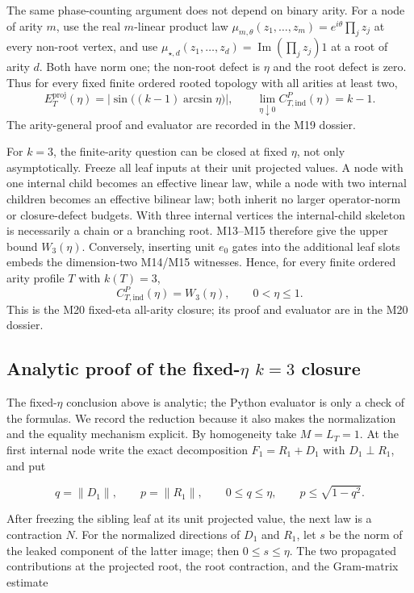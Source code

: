 \documentclass[11pt]{amsart}
\theoremstyle{definition}
\theoremstyle{remark}
\begin{document}
The same phase-counting argument does not depend on binary arity. For a node
of arity $m$, use the real $m$-linear product law
$\mu_{m,\theta}(z_1,\ldots,z_m)=e^{i\theta}\prod_j z_j$ at every non-root
vertex, and use $\mu_{\star,d}(z_1,\ldots,z_d)=
\operatorname{Im}(\prod_j z_j)1$ at a root of arity $d$. Both have norm one;
the non-root defect is $\eta$ and the root defect is zero. Thus for every
fixed finite ordered rooted topology with all arities at least two,
\[
 E_T^{\mathrm{proj}}(\eta)=
 \left|\sin\bigl((k-1)\arcsin\eta\bigr)\right|,
 \qquad
 \lim_{\eta\downarrow0}C_{T,\mathrm{ind}}^P(\eta)=k-1.
\]
The arity-general proof and evaluator are recorded in the M19 dossier.

For $k=3$, the finite-arity question can be closed at fixed $\eta$, not only
asymptotically. Freeze all leaf inputs at their unit projected values. A node
with one internal child becomes an effective linear law, while a node with two
internal children becomes an effective bilinear law; both inherit no larger
operator-norm or closure-defect budgets. With three internal vertices the
internal-child skeleton is necessarily a chain or a branching root. M13--M15
therefore give the upper bound $W_3(\eta)$. Conversely, inserting unit $e_0$
gates into the additional leaf slots embeds the dimension-two M14/M15
witnesses. Hence, for every finite ordered arity profile $T$ with $k(T)=3$,
\[
 C_{T,\mathrm{ind}}^P(\eta)=W_3(\eta),\qquad 0<\eta\le1.
\]
This is the M20 fixed-eta all-arity closure; its proof and evaluator are in
the M20 dossier.

\subsection{Analytic proof of the fixed-$\eta$ $k=3$ closure}
The fixed-$\eta$ conclusion above is analytic; the Python evaluator is only a
check of the formulas.  We record the reduction because it also makes the
normalization and the equality mechanism explicit.  By homogeneity take
$M=L_T=1$.  At the first internal node write the exact decomposition
$F_1=R_1+D_1$ with $D_1\perp R_1$, and put

\[
 q=\lVert D_1\rVert,\qquad p=\lVert R_1\rVert,
 \qquad 0\le q\le\eta,\qquad p\le\sqrt{1-q^2}.
\]

After freezing the sibling leaf at its unit projected value, the next law is
a contraction $N$.  For the normalized directions of $D_1$ and $R_1$, let
$s$ be the norm of the leaked component of the latter image; then
$0\le s\le\eta$.  The two propagated contributions at the projected root,
the root contraction, and the Gram-matrix estimate
\end{document}
